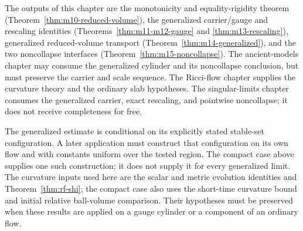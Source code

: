 The outputs of this chapter are the monotonicity and equality-rigidity theorem
(Theorem~\ref{thm:m10-reduced-volume}), the generalized carrier/gauge and
rescaling identities (Theorems~\ref{thm:m11-m12-gauge} and
\ref{thm:m13-rescaling}), generalized reduced-volume transport
(Theorem~\ref{thm:m14-generalized}), and the two noncollapse interfaces
(Theorem~\ref{thm:m15-noncollapse}).  The ancient-models chapter may consume
the generalized cylinder and its noncollapse conclusion, but must preserve
the carrier and scale sequence.  The Ricci-flow chapter supplies the curvature
theory and the ordinary slab hypotheses.  The singular-limits chapter consumes the
generalized carrier, exact rescaling, and pointwise noncollapse; it does not
receive completeness for free.

The generalized estimate is conditional on its explicitly stated stable-set
configuration.  A later application must construct that configuration on
its own flow and with constants uniform over the tested region.  The compact
case above supplies one such construction; it does not supply it for every
generalized limit.  The curvature inputs used here are the scalar and metric
evolution identities and Theorem~\ref{thm:rf-shi}; the compact case also uses
the short-time curvature bound and initial relative ball-volume comparison.
Their hypotheses must be preserved when these results are applied on a gauge
cylinder or a component of an ordinary flow.
